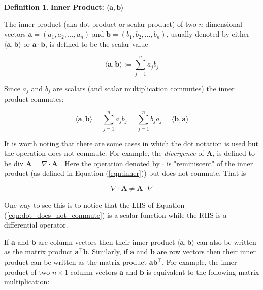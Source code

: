 \documentclass{article}
\theoremstyle{definition}
\newtheorem{definition}{Definition}[section]
\begin{document}
\bigskip
\begin{definition}
{\bf Inner Product:} $\langle \mathbf{a}, \mathbf{b} \rangle$

\bigskip
\noindent
The inner product (aka dot product 
or scalar product) of two $n$-dimensional vectors 
$\mathbf{a} = (a_1,a_2,\hdots, a_n)$ and 
$\mathbf{b} = (b_1,b_2,\hdots, b_n)$, usually 
denoted by either $\langle \mathbf{a}, \mathbf{b} 
\rangle$ or $\mathbf{a} \cdot \mathbf{b}$,
is defined to be the scalar value

\medskip
\begin{equation}
\langle \mathbf{a}, \mathbf{b} \rangle := \sum\limits_{j = 1}^{n} a_j b_j
\label{eqn:inner}
\end{equation}
\end{definition}

\smallskip
\noindent
Since $a_j$ and $b_j$ are scalars (and scalar multiplication commutes)
the inner product commutes:

\bigskip
\begin{equation}
  \langle \mathbf{a}, \mathbf{b} \rangle
  = \sum\limits_{j = 1}^{n} a_j b_j
  = \sum\limits_{j = 1}^{n} b_j a_j
  =  \langle \mathbf{b}, \mathbf{a} \rangle 
\label{eqn:dot_reverse}
\end{equation}

\bigskip
\noindent
It is worth noting that there are some cases in which the dot notation
is used but the operation does not commute. For example, the \emph{divergence} 
of $\mathbf{A}$, is defined to be div $\mathbf{A} = \nabla \cdot \mathbf{A}$ 
\cite{the_role_of_grad}. Here the operation denoted by $\cdot$ is "reminiscent" 
of the inner product (as defined in Equation (\ref{eqn:inner})) but does not commute. 
That is


\begin{equation}
\nabla \cdot \mathbf{A} \neq \mathbf{A} \cdot \nabla
\label{eqn:dot_does_not_commute}
\end{equation}

\bigskip
\noindent
One way to see this is to notice that the LHS of Equation 
(\ref{eqn:dot_does_not_commute}) is a scalar function while
the RHS  is a differential operator.

\bigskip
\noindent
If $\mathbf{a}$ and $\mathbf{b}$ are column vectors then their
inner product $\langle \mathbf{a}, \mathbf{b} \rangle$ can also be 
written as the matrix product $\mathbf{a}^{\intercal}\mathbf{b}$. 
Similarly, if $\mathbf{a}$ and $\mathbf{b}$ are row vectors then 
their inner product can be written as the matrix product
$\mathbf{a}\mathbf{b}^{\intercal}$. For example, the inner product
of two $n \times 1$ column vectors $\mathbf{a}$ and $\mathbf{b}$
is equivalent to the following matrix multiplication:
\end{document}
